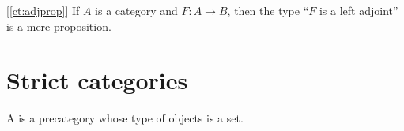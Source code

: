 \documentclass[hott-all.tex]{subfiles}
\begin{document}
%

\begin{cor}\label{ct:adjprop2}[\cref{ct:adjprop}]
  If $A$ is a category and $F:A\to B$, then the type ``$F$ is a left adjoint'' is a mere proposition.
\end{cor}


\section{Strict categories}
\label{sec:strict-categories}


\begin{defn}\label{ct:strict-category}
  A 
  is a precategory whose type of objects is a set.
\end{defn}

%
\end{document}
